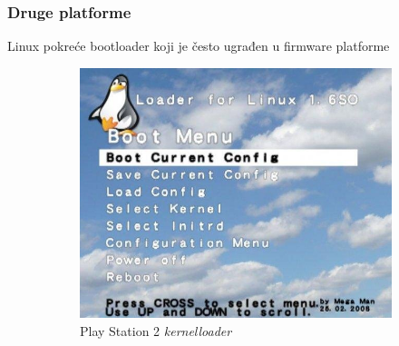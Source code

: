 \documentclass[t]{beamer}
\begin{document}
\begin{frame}
	\frametitle{Druge platforme}
	Linux pokreće bootloader koji je često ugrađen u firmware platforme
	\begin{figure}
		\centering
		\begin{subfigure}[f]{0.55\textwidth}
			\includegraphics[width=\textwidth]{ps2kernelloader.jpg}
			\caption*{Play Station 2 \emph{kernelloader}}
		\end{subfigure}
		\hfill
		\begin{subfigure}[f]{0.3\textwidth}

\end{subfigure}
\end{figure}
\end{frame}
\end{document}
